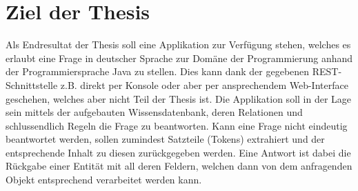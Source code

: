 \chapter{Ziel der Thesis}
\label{chap:thesisziel}
Als Endresultat der Thesis soll eine Applikation zur Verfügung stehen, welches es erlaubt eine Frage in deutscher Sprache zur Domäne der Programmierung anhand der Programmiersprache Java zu stellen. Dies kann dank der gegebenen REST-Schnittstelle z.B. direkt per Konsole oder aber per ansprechendem Web-Interface geschehen, welches aber nicht Teil der Thesis ist. Die Applikation soll in der Lage sein mittels der aufgebauten Wissensdatenbank, deren Relationen und schlussendlich Regeln die Frage zu beantworten. Kann eine Frage nicht eindeutig beantwortet werden, sollen zumindest Satzteile (Tokens) extrahiert und der entsprechende Inhalt zu diesen zurückgegeben werden. Eine Antwort ist dabei die Rückgabe einer Entität mit all deren Feldern, welchen dann von dem anfragenden Objekt entsprechend verarbeitet werden kann.

